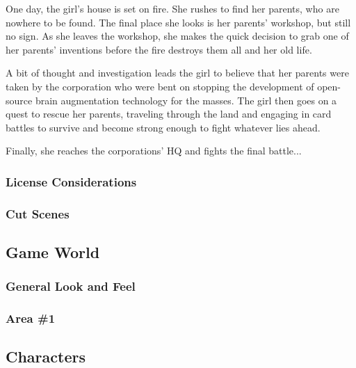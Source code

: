 \documentclass[12pt,titlepage]{article}
\newcounter{subsubsubsection}[subsubsection]
\begin{document}
One day, the girl's house is set on fire. She rushes to find her parents, who
are nowhere to be found. The final place she looks is her parents' workshop, but
still no sign. As she leaves the workshop, she makes the quick decision to grab
one of her parents' inventions before the fire destroys them all and her old
life.

A bit of thought and investigation leads the girl to believe that her parents
were taken by the corporation who were bent on stopping the development of
open-source brain augmentation technology for the masses. The girl then goes on
a quest to rescue her parents, traveling through the land and engaging in card
battles to survive and become strong enough to fight whatever lies ahead.

Finally, she reaches the corporations' HQ and fights the final battle...

\subsubsection{License Considerations}

\subsubsection{Cut Scenes}




\subsection{Game World}

\subsubsection{General Look and Feel}

\subsubsection{Area \#1}


\subsection{Characters}
\end{document}
